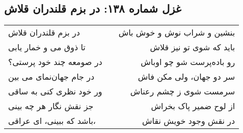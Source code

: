 \begin{center}
\section*{غزل شماره ۱۳۸: در بزم قلندران قلاش}
\label{sec:138}
\begin{longtable}{l p{0.5cm} r}
در بزم قلندران قلاش
&&
بنشین و شراب نوش و خوش باش
\\
تا ذوق می و خمار یابی
&&
باید که شوی تو نیز قلاش
\\
در صومعه چند خود پرستی؟
&&
رو باده‌پرست شو چو اوباش
\\
در جام جهان‌نمای می بین
&&
سر دو جهان، ولی مکن فاش
\\
ور خود نظری کنی به ساقی
&&
سرمست شوی ز چشم رعناش
\\
جز نقش نگار هر چه بینی
&&
از لوح ضمیر پاک بخراش
\\
باشد که ببینی، ای عراقی،
&&
در نقش وجود خویش نقاش
\\
\end{longtable}
\end{center}
